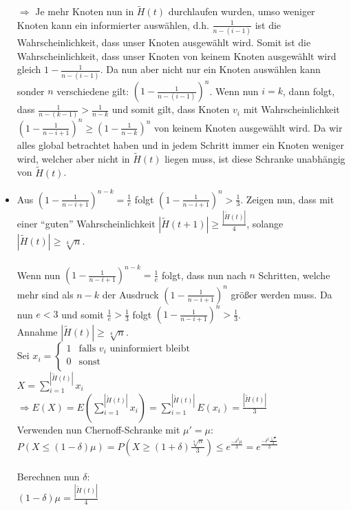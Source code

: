 \documentclass[12pt,a4paper]{report}
\begin{document}
\begin{itemize}
	$\Rightarrow$ Je mehr Knoten nun in $\tilde{H}(t)$ durchlaufen wurden, umso weniger Knoten kann ein informierter auswählen, d.h. $\frac{1}{n-(i-1)}$ ist die Wahrscheinlichkeit, dass unser Knoten ausgewählt wird. Somit ist die Wahrscheinlichkeit, dass unser Knoten von keinem Knoten ausgewählt wird gleich $1-\frac{1}{n-(i-1)}$. Da nun aber nicht nur ein Knoten auswählen kann sonder $n$ verschiedene gilt:
	$(1-\frac{1}{n-(i-1)})^n$. Wenn nun $i=k$, dann folgt, dass $\frac{1}{n-(k-1)} > \frac{1}{n-k}$ und somit gilt, dass Knoten $v_i$ mit Wahrscheinlichkeit
	$(1-\frac{1}{n-i+1})^n \ge (1-\frac{1}{n-k})^n$	von keinem Knoten ausgewählt wird. Da wir alles global betrachtet haben und in jedem Schritt immer ein Knoten weniger wird, welcher aber nicht in  $\tilde{H}(t)$ liegen muss, ist diese Schranke unabhängig von  $\tilde{H}(t)$.\\
	\item Aus $(1-\frac{1}{n-i+1})^{n-k} = \frac{1}{e}$   folgt $(1-\frac{1}{n-i+1})^n > \frac{1}{3}$. Zeigen nun, dass mit einer \enquote{guten} Wahrscheinlichkeit $|\tilde{H}(t+1)| \ge \frac{|\tilde{H}(t)|}{4}$, solange $|\tilde{H}(t)| \ge \sqrt[4]{n}$.\\
	\\
	Wenn nun $(1-\frac{1}{n-i+1})^{n-k} = \frac{1}{e}$ folgt, dass nun nach $n$ Schritten, welche mehr sind als $n-k$ der Ausdruck $(1-\frac{1}{n-i+1})^{n}$ größer werden muss. Da nun $e<3$ und somit $\frac{1}{e}>\frac{1}{3}$ folgt $(1-\frac{1}{n-i+1})^n > \frac{1}{3}$.\\
	Annahme $|\tilde{H}(t)| \ge \sqrt[4]{n}$.\\
	Sei $x_i=\begin{cases}
	1 & \text{falls } v_i \text{ uninformiert bleibt}\\
	0 & \text{sonst}\\
	\end{cases}$\\
	$X = \sum_{i=1}^{|\tilde{H}(t)|}x_i$\\
	$\Rightarrow E(X) =E(\sum_{i=1}^{|\tilde{H}(t)|}x_i)= \sum_{i=1}^{|\tilde{H}(t)|}E(x_i)=\frac{|\tilde{H}(t)|}{3}$\\
	Verwenden nun Chernoff-Schranke mit $\mu' = \mu$:\\
	$P(X\le(1-\delta)\mu)=P(X\ge(1+\delta)\frac{\sqrt[4]{n}}{3})\le e^{\frac{-\delta^2 \mu}{3}}=e^{\frac{-\delta^2 \frac{\sqrt[4]{n}}{3}}{3}}$\\
	\\
	Berechnen nun $\delta$:\\
	$(1-\delta)\mu = \frac{|\tilde{H}(t)|}{4}$\\

\end{itemize}
\end{document}
